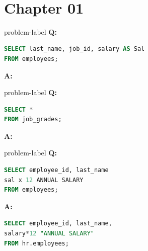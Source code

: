 \


\newpage
\tableofcontents
\newpage


\section*{Chapter 01}
{}

\begin{problem}{}{problem-label}
    \textbf{Q:} 
\begin{lstlisting}[language=SQL]
SELECT last_name, job_id, salary AS Sal
FROM employees;
\end{lstlisting}
    \vspace{1em}
    \textbf{A:} 
    
\end{problem}

\begin{problem}{}{problem-label}
    \textbf{Q:} 
\begin{lstlisting}[language=SQL]
SELECT *
FROM job_grades;
\end{lstlisting}
    \vspace{1em}
    \textbf{A:} 
    
\end{problem}

\begin{problem}{}{problem-label}
    \textbf{Q:} 

    \begin{lstlisting}[language=SQL]
SELECT employee_id, last_name
sal x 12 ANNUAL SALARY
FROM employees;
    \end{lstlisting}
    \vspace{1em}
    \textbf{A:} 
    \begin{lstlisting}[language=SQL]
SELECT employee_id, last_name,
salary*12 "ANNUAL SALARY"
FROM hr.employees;
\end{lstlisting}
    
\end{problem}

